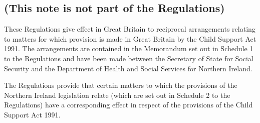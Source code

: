\documentclass[a4paper]{article}
\newcommand{\parthead}{}
\begin{document}
\renewcommand\parthead{--- Explanatory Note}

\subsection*{(This note is not part of the Regulations)}

 These Regulations give effect in Great Britain to reciprocal arrangements relating to matters for which provision is made in Great Britain by the Child Support Act 1991. The arrangements are contained in the Memorandum set out in Schedule 1 to the Regulations and have been made between the Secretary of State for Social Security and the Department of Health and Social Services for Northern Ireland.

  The Regulations provide that certain matters to which the provisions of the Northern Ireland legislation relate (which are set out in Schedule 2 to the Regulations) have a corresponding effect in respect of the provisions of the Child Support Act 1991.
\end{document}
